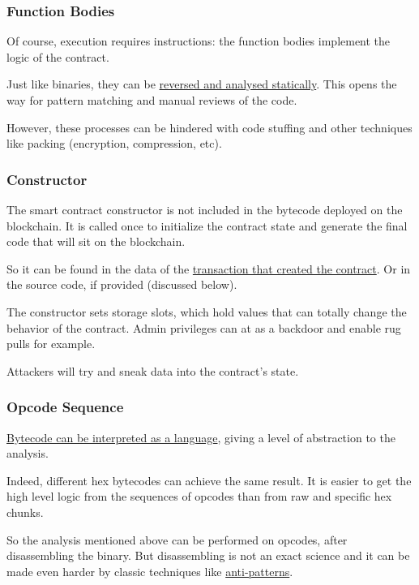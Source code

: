 \subsubsection{Function Bodies}

Of course, execution requires instructions: the function bodies implement the logic of the contract.

Just like binaries, they can be \href{\urlarticlereversingcontract}{reversed and analysed statically}.
This opens the way for pattern matching and manual reviews of the code.

However, these processes can be hindered with code stuffing and other techniques like packing (encryption, compression, etc).

\subsubsection{Constructor}

The smart contract constructor is not included in the bytecode deployed on the blockchain.
It is called once to initialize the contract state and generate the final code that will sit on the blockchain.

So it can be found in the data of the \href{https://etherscan.io/tx/0xd66169d4a5feaceaf777b9949ad0e9bc5621a438846a90087e50a5d7b9b0ad1e}{transaction that created the contract}.
Or in the source code, if provided (discussed below).

The constructor sets storage slots, which hold values that can totally change the behavior of the contract.
Admin privileges can at as a backdoor and enable rug pulls for example.

Attackers will try and sneak data into the contract's state.

\subsubsection{Opcode Sequence}

\href{\urlcodeevmdasm}{Bytecode can be interpreted as a language}, giving a level of abstraction to the analysis.

Indeed, different hex bytecodes can achieve the same result.
It is easier to get the high level logic from the sequences of opcodes than from raw and specific hex chunks.

So the analysis mentioned above can be performed on opcodes, after disassembling the binary.
But disassembling is not an exact science and it can be made even harder by classic techniques like \href{\urlpapereshield}{anti-patterns}.

